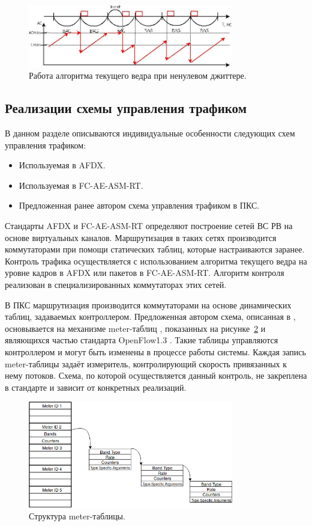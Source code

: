 \documentclass[12pt, a4paper]{article}
\begin{document}
\begin{figure}[h!]
	\centering
	\includegraphics[width=0.80\textwidth]{img/jit.png}
	\caption{Работа алгоритма текущего ведра при ненулевом джиттере.}
	\label{pic:scheme:jit}
\end{figure}
\FloatBarrier

\subsection{Реализации схемы управления трафиком}
В данном разделе описываются индивидуальные особенности следующих схем управления трафиком:
\begin{itemize}
	\item Используемая в AFDX.
	\item Используемая в FC-AE-ASM-RT.
	\item Предложенная ранее автором схема управления трафиком в ПКС.
\end{itemize}

Стандарты AFDX и FC-AE-ASM-RT определяют построение сетей ВС РВ на основе виртуальных каналов. Маршрутизация в таких сетях производится коммутаторами при помощи статических таблиц, которые настраиваются заранее. Контроль трафика осуществляется с использованием алгоритма текущего ведра на уровне кадров в AFDX или пакетов в FC-AE-ASM-RT. Алгоритм контроля реализован в специализированных коммутаторах этих сетей.

В ПКС маршрутизация производится коммутаторами на основе динамических таблиц, задаваемых контроллером. Предложенная автором схема, описанная в \cite{vlsdn}, основывается на механизме meter-таблиц \cite{meter}, показанных на рисунке~\ref{pic:scheme:meter} и являющихся частью стандарта OpenFlow1.3 \cite{openflow}. Такие таблицы управляются контроллером и могут быть изменены в процессе работы системы. Каждая запись meter-таблицы задаёт измеритель, контролирующий скорость привязанных к нему потоков. Схема, по которой осуществляется данный контроль, не закреплена в стандарте и зависит от конкретных реализаций. 

\begin{figure}[h!]
	\centering
	\includegraphics[width=0.80\textwidth]{img/meter.png}
	\caption{Структура meter-таблицы.}
	\label{pic:scheme:meter}
\end{figure}
\end{document}
